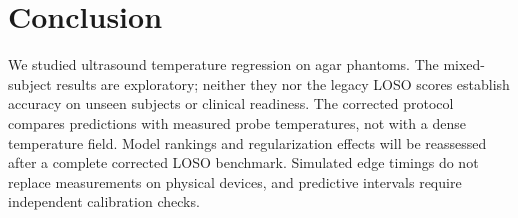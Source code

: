 \documentclass[conference]{IEEEtran}
\begin{document}
\section{Conclusion}
We studied ultrasound temperature regression on agar phantoms. The mixed-subject
results are exploratory; neither they nor the legacy LOSO scores establish
accuracy on unseen subjects or clinical readiness. The corrected protocol
compares predictions with measured probe temperatures, not with a dense
temperature field. Model rankings and regularization effects will be reassessed
after a complete corrected LOSO benchmark. Simulated edge timings do not
replace measurements on physical devices, and predictive intervals require
independent calibration checks.





\end{document}
